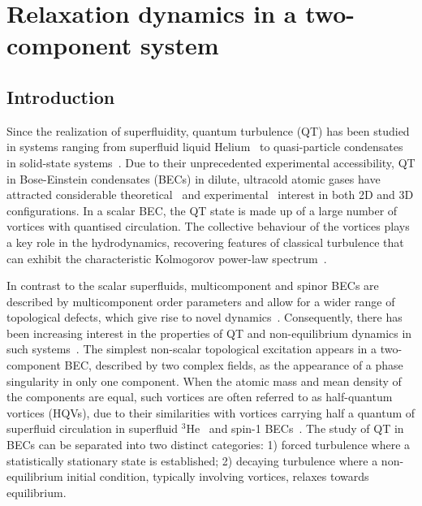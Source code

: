 \chapter{Relaxation dynamics in a two-component system}

\section{Introduction}
Since the realization of superfluidity, quantum turbulence (QT) has been studied
in systems ranging from superfluid liquid
Helium~\cite{Barenghi2014, Walmsley2014} to quasi-particle
condensates in solid-state systems~\cite{Kreil2018}.
Due to their unprecedented experimental accessibility, QT in Bose-Einstein
condensates (BECs) in dilute, ultracold atomic gases have attracted considerable
theoretical~\cite{Kobayashi2007,Numasato2010, Reeves2013,
Billam2014,Simula2014,Baggaley2018} and
experimental~\cite{Henn2009,Kwon2014,Seo2017,Navon2019,Gauthier2019,
Johnstone2019} interest in both 2D and 3D configurations.
In a scalar BEC, the QT state is made up of a large number of vortices with
quantised circulation. The collective behaviour of the vortices plays a key role
in the hydrodynamics, recovering features of classical turbulence that can
exhibit the characteristic Kolmogorov power-law spectrum~\cite{Kobayashi2005}.


In contrast to the scalar superfluids, multicomponent and spinor BECs are
described by multicomponent order parameters and allow for a wider range of
topological defects, which give rise to novel dynamics~\cite{Kasamatsu2016,
Weiss2019,Kobayashi2009,Kasamatsu2005}.
Consequently, there has been increasing interest in the properties of QT and
non-equilibrium dynamics in such
systems~\cite{Salman2009, Schmied2019, Karl2013,
Prufer2018, Hofmann2014}.
The simplest non-scalar topological excitation appears in a two-component BEC,
described by two complex fields, as the appearance of a phase singularity in
only one component. 
When the atomic mass and mean density of the components are equal, such vortices
are often referred to as half-quantum vortices (HQVs), due to their similarities
with vortices carrying half a quantum of superfluid circulation in superfluid
$^3$He~\cite{Autti2016} and spin-1
BECs~\cite{Leonhardt2000,Seo2015}.
The study of QT in BECs can be separated into two distinct categories: 1) forced
turbulence where a statistically stationary state is established; 2) decaying
turbulence where a non-equilibrium initial condition, typically involving
vortices, relaxes towards equilibrium. 


